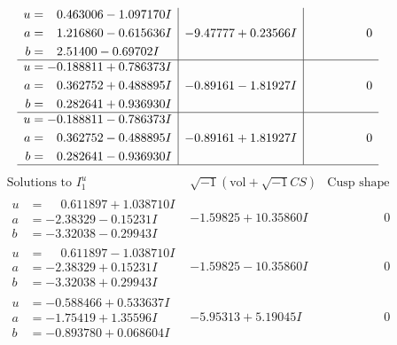 \documentclass[1p]{elsarticle_modified}
\theoremstyle{definition}
\newcommand{\I}{\sqrt{-1}}
\begin{document}
$$\begin{array}{c|c|c}
\begin{aligned}
u &= \phantom{-}0.463006 - 1.097170 I \\
a &= \phantom{-}1.216860 - 0.615636 I \\
b &= \phantom{-}2.51400 - 0.69702 I\end{aligned}
 & -9.47777 + 0.23566 I & \phantom{-0.000000 } 0 \\ \hline\begin{aligned}
u &= -0.188811 + 0.786373 I \\
a &= \phantom{-}0.362752 + 0.488895 I \\
b &= \phantom{-}0.282641 + 0.936930 I\end{aligned}
 & -0.89161 - 1.81927 I & \phantom{-0.000000 } 0 \\ \hline\begin{aligned}
u &= -0.188811 - 0.786373 I \\
a &= \phantom{-}0.362752 - 0.488895 I \\
b &= \phantom{-}0.282641 - 0.936930 I\end{aligned}
 & -0.89161 + 1.81927 I & \phantom{-0.000000 } 0\\
 \hline 
 \end{array}$$\newpage$$\begin{array}{c|c|c}  
\text{Solutions to }I^u_{1}& \I (\text{vol} + \sqrt{-1}CS) & \text{Cusp shape}\\
 \hline 
\begin{aligned}
u &= \phantom{-}0.611897 + 1.038710 I \\
a &= -2.38329 - 0.15231 I \\
b &= -3.32038 - 0.29943 I\end{aligned}
 & -1.59825 + 10.35860 I & \phantom{-0.000000 } 0 \\ \hline\begin{aligned}
u &= \phantom{-}0.611897 - 1.038710 I \\
a &= -2.38329 + 0.15231 I \\
b &= -3.32038 + 0.29943 I\end{aligned}
 & -1.59825 - 10.35860 I & \phantom{-0.000000 } 0 \\ \hline\begin{aligned}
u &= -0.588466 + 0.533637 I \\
a &= -1.75419 + 1.35596 I \\
b &= -0.893780 + 0.068604 I\end{aligned}
 & -5.95313 + 5.19045 I & \phantom{-0.000000 } 0 \\ \hline\begin{aligned}

\end{aligned}
\end{array}$$
\end{document}

